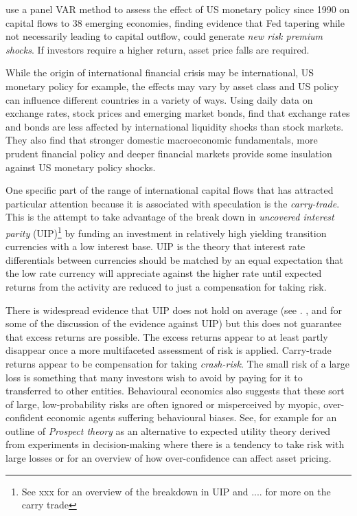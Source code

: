 \documentclass[12pt, a4paper, oneside]{article} %
\begin{document}
\citet{IMFLatam} use a panel VAR method to assess the effect of US monetary policy since 1990 on capital flows to 38 emerging economies, finding evidence that Fed tapering while not necessarily leading to capital outflow, could generate \emph{new risk premium shocks}.   If investors require a higher return, asset price falls are required. 

While the origin of international financial crisis may be international, US monetary policy for example, the effects may vary by asset class and US policy can influence different countries in a variety of ways.  Using daily data on exchange rates, stock prices and emerging market bonds, \citet{Tapering} find that exchange rates and bonds are less affected by international liquidity shocks than stock markets.  They also find that stronger domestic macroeconomic fundamentals, more prudent financial policy and deeper financial markets provide some insulation against US monetary policy shocks.

One specific part of the range of international capital flows that has attracted particular attention because it is associated with speculation is the \emph{carry-trade}.  This is the attempt to take advantage of the break down in \emph{uncovered interest parity} (UIP)\footnote{See xxx for an overview of the breakdown in UIP and .... for more on the carry trade} by funding an investment in relatively high yielding transition currencies with a low interest base.  UIP is the theory that interest rate differentials between currencies should be matched by an equal expectation that the low rate currency will appreciate against the higher rate until expected returns from the activity are reduced to just a compensation for taking risk. %

There is widespread evidence that UIP does not hold on average (see \citet{FrootAnomolies}. \citet{FrootFrankelFDB}, \citet{Hodrick1987} and \citet{SpronkEER} for some of the discussion of the evidence against UIP) but this does not guarantee that excess returns are possible.  The excess returns appear to at least partly disappear once a more multifaceted assessment of risk is applied.  Carry-trade returns appear to be compensation for taking \emph{crash-risk}.  The small risk of a large loss is something that many investors wish to avoid by paying for it to transferred to other entities.   Behavioural economics also suggests that these sort of large, low-probability risks are often ignored or misperceived by myopic, over-confident economic agents suffering behavioural biases. See, for example \citet{Kahneman1979Prospect} for an outline of \emph{Prospect theory} as an alternative to expected utility theory derived from experiments in decision-making where there is a tendency to take risk with large losses or \citet{odean1998volume} for an overview of how over-confidence can affect asset pricing.  
\end{document}
